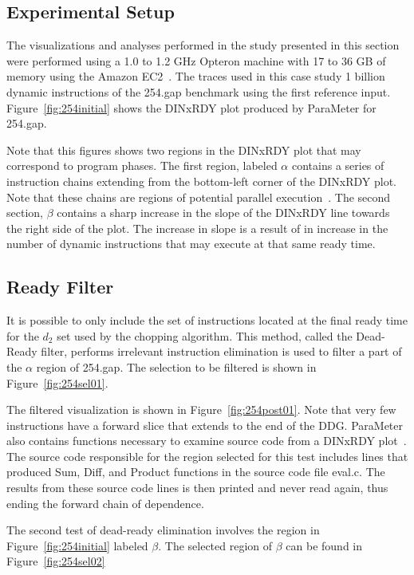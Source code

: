 {\subsection {Experimental Setup}

The visualizations and analyses performed in the study presented in this section were performed using a 1.0 to 1.2 GHz Opteron machine with 17 to 36 GB of memory using the Amazon EC2~\cite{ec2:10:web}. The traces used in this case study 1 billion dynamic instructions of the 254.gap benchmark using the first reference input. Figure~\ref{fig:254initial} shows the DINxRDY plot produced by ParaMeter for 254.gap.

Note that this figures shows two regions in the DINxRDY plot that may correspond to program phases.  The first region, labeled $\alpha$ contains a series of instruction chains extending from the bottom-left corner of the DINxRDY plot.  Note that these chains are regions of potential parallel execution~\cite{price:08:pact}. The second section, $\beta$ contains a sharp increase in the slope of the DINxRDY line towards the right side of the plot.  The increase in slope is a result of in increase in the number of dynamic instructions that may execute at that same ready time.

\subsection {Ready Filter}

It is possible to only include the set of instructions located at the final ready time for the $d_2$ set used by the chopping algorithm. This method, called the Dead-Ready filter, performs irrelevant instruction elimination is used to filter a part of the $\alpha$ region of 254.gap.  The selection to be filtered is shown in Figure~\ref{fig:254sel01}.

The filtered visualization is shown in Figure~\ref{fig:254post01}. Note that very few instructions have a forward slice that extends to the end of the DDG.  ParaMeter also contains functions necessary to examine source code from a DINxRDY plot~\cite{price:08:pact}.  The source code responsible for the region selected for this test includes lines that produced Sum, Diff, and Product functions in the source code file eval.c.  The results from these source code lines is then printed and never read again, thus ending the forward chain of dependence.

The second test of dead-ready elimination involves the region in Figure~\ref{fig:254initial} labeled $\beta$.  The selected region of $\beta$ can be found in Figure~\ref{fig:254sel02}

}
